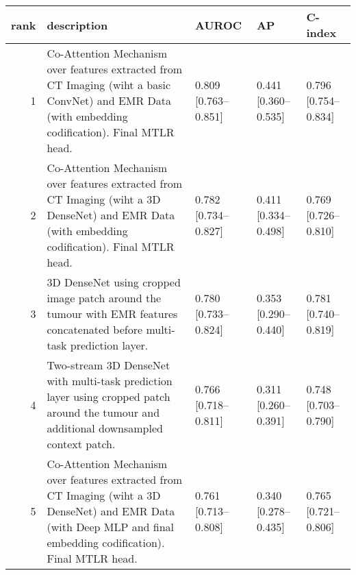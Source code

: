 \begin{tabular}{rllll}
\toprule
 rank &                                                                                                                                                          description &                AUROC &                   AP &              C-index \\
\midrule
    1 &                   Co-Attention Mechanism over features extracted from CT Imaging (wiht a basic ConvNet) and EMR Data (with embedding codification). Final MTLR head. & 0.809 [0.763--0.851] & 0.441 [0.360--0.535] & 0.796 [0.754--0.834] \\
    2 &                     Co-Attention Mechanism over features extracted from CT Imaging (wiht a 3D DenseNet) and EMR Data (with embedding codification). Final MTLR head. & 0.782 [0.734--0.827] & 0.411 [0.334--0.498] & 0.769 [0.726--0.810] \\
    3 &                                           3D DenseNet using cropped image patch around the tumour with EMR features concatenated before multi-task prediction layer. & 0.780 [0.733--0.824] & 0.353 [0.290--0.440] & 0.781 [0.740--0.819] \\
    4 &                              Two-stream 3D DenseNet with multi-task prediction layer using cropped patch around the tumour and additional downsampled context patch. & 0.766 [0.718--0.811] & 0.311 [0.260--0.391] & 0.748 [0.703--0.790] \\
    5 &  Co-Attention Mechanism over features extracted from CT Imaging (wiht a 3D DenseNet) and EMR Data (with Deep MLP and final embedding codification). Final MTLR head. & 0.761 [0.713--0.808] & 0.340 [0.278--0.435] & 0.765 [0.721--0.806] \\
\bottomrule
\end{tabular}

